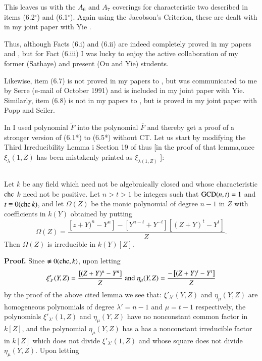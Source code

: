 This leaves us with the $A_{6}$ and $A_{7}$ coverings for characteristic two described in items (6.2$^\circ$) and (6.1$^\circ$). Again using the Jacobson's Criterion, these are dealt with in my joint paper with Yie \cite{art1-key17}.

Thus, although Facts (6.i) and (6.ii) are indeed completely proved in my papers \cite{art1-key8} and \cite{art1-key10}, but for Fact (6.iii) I was lucky to enjoy the active collaboration of my former (Sathaye) and present (Ou and Yie) students.

Likewise, item (6.7) is not proved in my papers \cite{art1-key8} to \cite{art1-key10}, but was communicated to me by Serre (e-mail of October 1991) and is included in my joint paper \cite{art1-key17} with Yie. Similarly, item (6.8) is not in my papers \cite{art1-key8} to \cite{art1-key10}, but is proved in my joint paper \cite{art1-key15} with Popp and Seiler.

\medskip
In \cite{art1-key8} I used polynomial $\widetilde{F}$ into the polynomial  $\overline{F}$ and thereby get a proof of a stronger version of (6.1*) to (6.5*) without CT. Let us start by modifying the Third Irreducibility Lemma i Section 19 of \cite{art1-key8} thus [in the proof of that lemma,once $\xi_{\lambda}(1, Z)$ has been mistakenly printed as $\xi_{\lambda(1, Z)}$ ]:

\subsection{}

Let $k$ be any field which need not be algebraically closed and whose characteristic $\operatorname{chc}$ $k$ need not be positive. Let $n > t > 1$ be integers such that $\operatorname{GCD}(n,t)=1$ and $t\equiv 0(\operatorname{chc} k)$, and let $\Omega(Z)$ be the monic polynomial of degree $n-1$ in $Z$ with coefficients in $k(Y)$ obtained by putting
$$
\Omega(Z)= \dfrac{\left[z+Y)^{n}-Y^{n}\right]-\left[Y^{n-t}+Y^{-t}\right]\left[(Z+Y)^{t}-Y^{t}\right]}{Z}.   
$$
Then $\Omega(Z)$ is irreducible in $k(Y)[Z]$.

\noindent
\textbf{Proof.} Since $\nequiv 0(\chc, k)$, upon letting
$$
\xi'_{\lambda'}(Y,Z)=\dfrac{\left[(Z+Y)^n-Y^{n}\right]}{Z} \; {\rm and}\; \eta_{\mu}(Y,Z)=\dfrac{-\left[(Z+Y)^t-Y^{t}\right]}{Z}
$$
by the proof of the above cited lemma we see that: $\xi'_{\lambda'}(Y,Z)$ and $\eta_{\mu}(Y,Z)$ are homogeneous polynomials of degree $\lambda'=n-1$ and $\mu = t-1$ respectively, the polynomials $\xi'_{\lambda'}(1,Z)$ and $\eta_{\mu}(Y,Z)$ have no nonconstant common factor in $k[Z]$, and the polynomial $\eta_{\mu}(Y,Z)$ has a has a nonconstant irreducible factor in $k[Z]$ which does not divide $\xi'_{\lambda'}(1,Z)$ and whose square does not divide $\eta_{\mu}(Y,Z)$. Upon letting 
